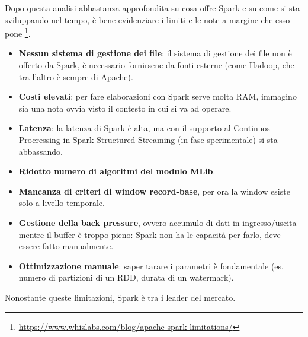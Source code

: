 \documentclass[12pt,italian]{article}
\begin{document}
Dopo questa analisi abbastanza approfondita su cosa offre Spark e su come si sta sviluppando nel tempo, è bene evidenziare i limiti e le note a margine che esso pone \footnote{\url{https://www.whizlabs.com/blog/apache-spark-limitations/}}. 
\begin{itemize}
	\item \textbf{Nessun sistema di gestione dei file}: il sistema di gestione dei file non è offerto da Spark, è necessario fornirsene da fonti esterne (come Hadoop, che tra l'altro è sempre di Apache).
	\item \textbf{Costi elevati}: per fare elaborazioni con Spark serve molta RAM, immagino sia una nota ovvia visto il contesto in cui si va ad operare.
	\item \textbf{Latenza}: la latenza di Spark è alta, ma con il supporto al Continuos Procressing in Spark Structured Streaming (in fase sperimentale) si sta abbassando.
	\item \textbf{Ridotto numero di algoritmi del modulo MLib}.
	\item \textbf{Mancanza di criteri di window record-base}, per ora la window esiste solo a livello temporale.
	\item \textbf{Gestione della back pressure}, ovvero accumulo di dati in ingresso/uscita mentre il buffer è troppo pieno: Spark non ha le capacità per farlo, deve essere fatto manualmente.
	\item \textbf{Ottimizzazione manuale}: saper tarare i parametri è fondamentale (es. numero di partizioni di un RDD, durata di un watermark).
\end{itemize}
Nonostante queste limitazioni, Spark è tra i leader del mercato.

\newpage
\printbibliography
\end{document}
